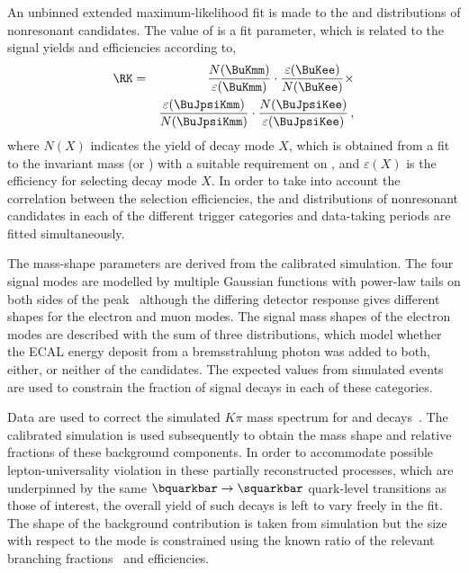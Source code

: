 An unbinned extended maximum-likelihood fit is made to the \mKee and \mKmm distributions of nonresonant candidates. The value of \RK is a fit parameter, which is related to the signal yields and efficiencies according to,  
\begin{eqnarray}
    \label{eq:RKdetail}
       \RK &=&\frac{N(\BuKmm)}{\varepsilon(\BuKmm)}\cdot\frac{\varepsilon(\BuKee)}{N(\BuKee)} \times \nonumber\\
 & & \frac{\varepsilon(\BuJpsiKmm)}{N(\BuJpsiKmm)}\cdot\frac{N(\BuJpsiKee)}{\varepsilon(\BuJpsiKee)} \,, 
\end{eqnarray}
\noindent where $N(X)$  indicates the  yield  of  decay  mode $X$,  which  is  obtained from a fit to the invariant mass \mKll (or \mKllconst) with a suitable requirement on \qsq, and $\varepsilon(X)$ is the efficiency for selecting decay mode $X$. In order to take into account the correlation between the selection efficiencies, the \mKee and \mKmm distributions of nonresonant candidates in each of the different trigger categories and data-taking periods are fitted simultaneously. 

The mass-shape parameters are derived from the calibrated simulation. The four signal modes are modelled by multiple Gaussian functions with  power-law tails on both sides of the peak~\cite{Skwarnicki:1986xj,Santos:2013gra} although the differing detector response gives different shapes for the electron and muon modes. The signal mass shapes of the electron modes are described with the sum of three distributions, which model whether the ECAL energy deposit from a bremsstrahlung photon was added to both, either, or neither of the \epm candidates. The expected values from simulated events are used to constrain the fraction of signal decays in each of these categories.

Data are used to correct the simulated $K\pi$ mass spectrum for \BuBdKpiplusee and \BuBdKpijpsi decays~\cite{LHCb-PAPER-2016-025}. The calibrated simulation is used subsequently to obtain the \mKll mass shape and relative fractions of these background components. In order to accommodate possible lepton-universality violation in these partially reconstructed processes, which are underpinned by the same $\bquarkbar\to\squarkbar$ quark-level transitions as those of interest, the overall yield of such decays is left to vary freely in the fit. The shape of the \BuJpsipi background contribution is taken from simulation but the size with respect to the \BuJpsiK mode is constrained using the known ratio of the relevant branching fractions~\cite{LHCb-PAPER-2016-051, PDG2020} and efficiencies.

